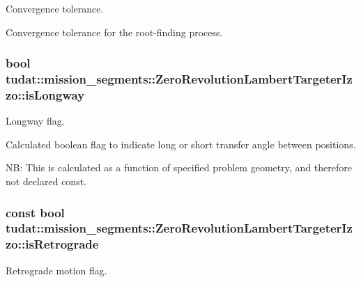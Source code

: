 Convergence tolerance. 

Convergence tolerance for the root-\/finding process. 
\subsubsection[{\texorpdfstring{is\+Longway}{isLongway}}]{\setlength{\rightskip}{0pt plus 5cm}bool tudat\+::mission\+\_\+segments\+::\+Zero\+Revolution\+Lambert\+Targeter\+Izzo\+::is\+Longway\hspace{0.3cm}{\ttfamily [protected]}}\hypertarget{classtudat_1_1mission__segments_1_1ZeroRevolutionLambertTargeterIzzo_a8049243b12a78c7308869558583d6558}{}\label{classtudat_1_1mission__segments_1_1ZeroRevolutionLambertTargeterIzzo_a8049243b12a78c7308869558583d6558}


Longway flag. 

Calculated boolean flag to indicate long or short transfer angle between positions.

NB\+: This is calculated as a function of specified problem geometry, and therefore not declared const. 
\subsubsection[{\texorpdfstring{is\+Retrograde}{isRetrograde}}]{\setlength{\rightskip}{0pt plus 5cm}const bool tudat\+::mission\+\_\+segments\+::\+Zero\+Revolution\+Lambert\+Targeter\+Izzo\+::is\+Retrograde\hspace{0.3cm}{\ttfamily [protected]}}\hypertarget{classtudat_1_1mission__segments_1_1ZeroRevolutionLambertTargeterIzzo_a1dd22e2d2ed5159ad02566429544946d}{}\label{classtudat_1_1mission__segments_1_1ZeroRevolutionLambertTargeterIzzo_a1dd22e2d2ed5159ad02566429544946d}


Retrograde motion flag. 

